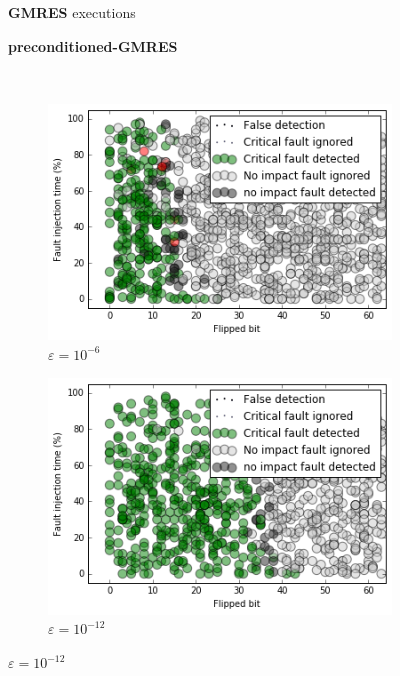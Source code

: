 \begin{figure}[h]
	\centering
    
\begin{minipage}[b]{0.45\linewidth}
\centering
\textbf{GMRES} executions
\end{minipage}
\quad
\begin{minipage}{0.45\linewidth}
\centering
\textbf{preconditioned-GMRES}
\end{minipage}\\


    \begin{minipage}[b]{0.48\linewidth}
	
	\begin{subfigure}[t]{\linewidth}
		\centering
		\includegraphics[width=1.1\linewidth]{figures/test_result_c05_0_full.png}
		\caption{$\varepsilon = 10^{-6}$}\label{fig:test_result_c05_0_full}	
	\end{subfigure}
    \quad
    \begin{subfigure}[t]{\linewidth}
		\centering
		\includegraphics[width=1.1\linewidth]{figures/test_result_c05_1_full.png}
		\caption{$\varepsilon = 10^{-12}$}\label{fig:test_result_c05_1_full}	
	\end{subfigure}
    \end{minipage}
    \quad
    \begin{minipage}[b]{0.48\linewidth}
    	

\end{minipage}
\end{figure}
